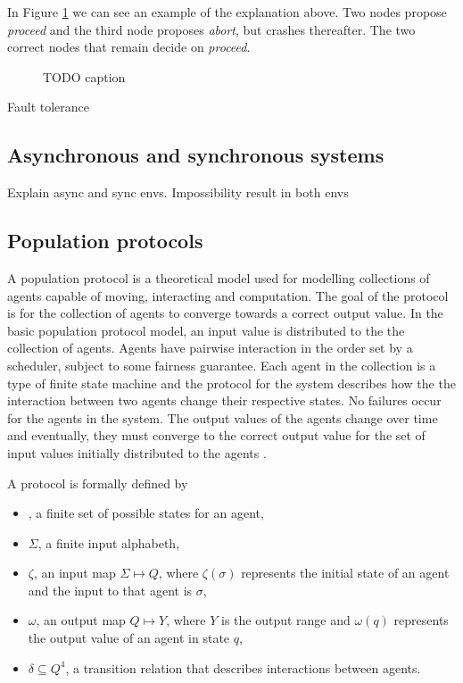


In Figure \ref{fig:ConsensusProblem} we can see an example of the explanation above. Two nodes propose \emph{proceed} and the third node proposes \emph{abort}, but crashes thereafter. The two correct nodes that remain decide on \emph{proceed}.
\begin{figure}[H]
    \centering
    
    \caption{TODO caption}
    \label{fig:ConsensusProblem}
\end{figure}


Fault tolerance

\subsection{Asynchronous and synchronous systems}

Explain async and sync envs. Impossibility result in both envs

\subsection{Population protocols}
 A population protocol is a theoretical model used for modelling collections of agents capable of moving, interacting and computation. The goal of the protocol is for the collection of agents to converge towards a correct output value. In the basic population protocol model, an input value is distributed to the the collection of agents. Agents have pairwise interaction in the order set by a scheduler, subject to some fairness guarantee. Each agent in the collection is a type of finite state machine and the protocol for the system describes how the the interaction between two agents change their respective states. No failures occur for the agents in the system. The output values of the agents change over time and eventually, they must converge to the correct output value for the set of input values initially distributed to the agents \cite{aspnesIntroductionPopulationProtocols2009}. 

 A protocol is formally defined by
 \begin{itemize}
     \item {}, a finite set of possible states for an agent,
     \item $\Sigma$, a finite input alphabeth,
     \item $\zeta$, an input map $\Sigma \mapsto Q$, where $\zeta(\sigma)$ represents the initial state of an agent and the input to that agent is $\sigma$,
     \item $\omega$, an output map $Q \mapsto Y$, where $Y$ is the output range and $\omega(q)$ represents the output value of an agent in state $q$,
     \item $\delta \subseteq Q^4$, a transition relation that describes interactions between agents.
     
 \end{itemize}

